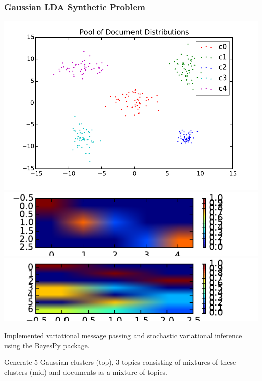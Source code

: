 \documentclass{beamer}
\begin{document}
\begin{frame}
  \frametitle{Gaussian LDA Synthetic Problem}
  \begin{center}
    \includegraphics[height=0.2\textheight]{assets/plot.pdf}\\
    \includegraphics[height=0.2\textheight]{assets/true_topics.pdf}\\
    \includegraphics[height=0.2\textheight]{assets/true_document_dictionary.pdf}
  \end{center}
  \begin{itemize}
    {\tiny
    \item Implemented variational message passing \citep{Winn05} and stochastic variational inference using the BayesPy \citep{Luttinen14} package. 
    \item Generate 5 Gaussian clusters (top), 3 topics consisting of mixtures of these clusters (mid) and documents as a mixture of topics.
    \par}
  \end{itemize}
\end{frame}
\end{document}
